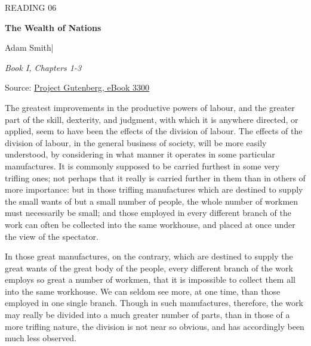 \begingroup

\thispagestyle{fancy}
\label{article-06}
\begingroup\raggedright
\setlength{\parindent}{0pt}
{\fontsize{9}{12}\selectfont\color{headgrey}READING 06\par}
\vspace{4pt}
{\fontsize{24}{30}\selectfont\bfseries The Wealth of Nations\par}
\vspace{7pt}
{\fontsize{12}{18}\selectfont Adam Smith\quad|\par}
\vspace{4pt}
{\fontsize{11}{16}\selectfont\itshape Book I, Chapters 1-3\par}
\vspace{4pt}
{\fontsize{9}{12.5}\selectfont\color{headgrey}Source: \href{https://www.gutenberg.org/ebooks/3300}{Project Gutenberg, eBook 3300}\par}
\endgroup
\vspace{6pt}


The greatest improvements in the productive powers of labour, and the greater part of the skill, dexterity, and judgment, with which it is anywhere directed, or applied, seem to have been the effects of the division of labour. The effects of the division of labour, in the general business of society, will be more easily understood, by considering in what manner it operates in some particular manufactures. It is commonly supposed to be carried furthest in some very trifling ones; not perhaps that it really is carried further in them than in others of more importance: but in those trifling manufactures which are destined to supply the small wants of but a small number of people, the whole number of workmen must necessarily be small; and those employed in every different branch of the work can often be collected into the same workhouse, and placed at once under the view of the spectator.\par

In those great manufactures, on the contrary, which are destined to supply the great wants of the great body of the people, every different branch of the work employs so great a number of workmen, that it is impossible to collect them all into the same workhouse. We can seldom see more, at one time, than those employed in one single branch. Though in such manufactures, therefore, the work may really be divided into a much greater number of parts, than in those of a more trifling nature, the division is not near so obvious, and has accordingly been much less observed.\par

